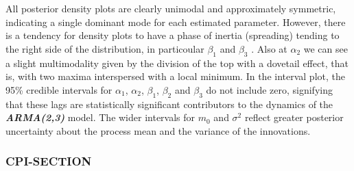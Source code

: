 \documentclass{Configuration_Files/PoliMi3i_thesis}
\begin{document}
All posterior density plots are clearly unimodal and approximately symmetric, indicating a single dominant mode for each estimated parameter. However, there is a tendency for density plots to have a phase of inertia (spreading) tending to the right side of the distribution, in particoular \(\beta_1\) and \(\beta_3\) . Also at \(\alpha_2\) we can see a slight multimodality given by the division of the top with a dovetail effect, that is, with two maxima interspersed with a local minimum.  In the interval plot, the 95\% credible intervals for \(\alpha_1\), \(\alpha_2\), \(\beta_1\), \(\beta_2\) and \(\beta_3\) do not include zero, signifying that these lags are statistically significant contributors to the dynamics of the \textbf{\textit{ARMA(2,3)}} model. The wider intervals for \(m_0\) and \(\sigma^2\) reflect greater posterior uncertainty about the process mean and the variance of the innovations.


\newpage
\subsubsection{CPI-SECTION}
\end{document}
